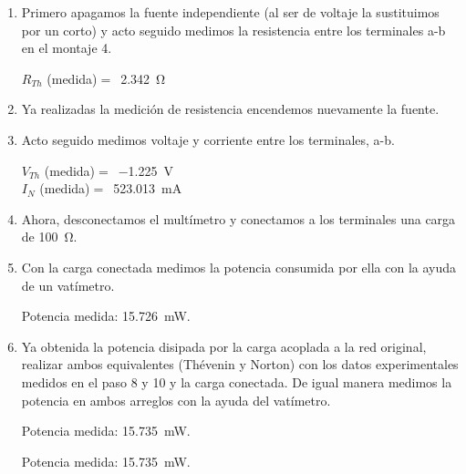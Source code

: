 \documentclass{article}
\begin{document}
\begin{enumerate}

        \item Primero apagamos la fuente independiente (al ser de voltaje la sustituimos por un corto) y acto seguido medimos la resistencia entre los terminales a-b en el montaje 4.
        
        $R_{Th}$ (medida)$=$~\SI{2.342}{\ohm}

        \item Ya realizadas la medición de resistencia encendemos nuevamente la fuente.
        
        \item Acto seguido medimos voltaje y corriente entre los terminales, a-b.
        
        $V_{Th}$ (medida)$=$~\SI{-1.225}{\volt}\\
        $I_{N}$ (medida)$=$~\SI{523.013}{\milli\ampere}

        \item Ahora, desconectamos el multímetro y conectamos a los terminales una carga de \SI{100}{\ohm}.
        
        \item Con la carga conectada medimos la potencia consumida por ella con la ayuda de un vatímetro.
        
        Potencia medida: \SI{15.726}{\milli\watt}.

        \item Ya obtenida la potencia disipada por la carga acoplada a la red original, realizar ambos equivalentes (Thévenin y Norton) con los datos experimentales medidos en el paso 8 y 10 y la carga conectada. De igual manera medimos la potencia en ambos arreglos con la ayuda del vatímetro.
        

        Potencia medida: \SI{15.735}{\milli\watt}.


        Potencia medida: \SI{15.735}{\milli\watt}.
        
    \end{enumerate}
    
\end{document}
